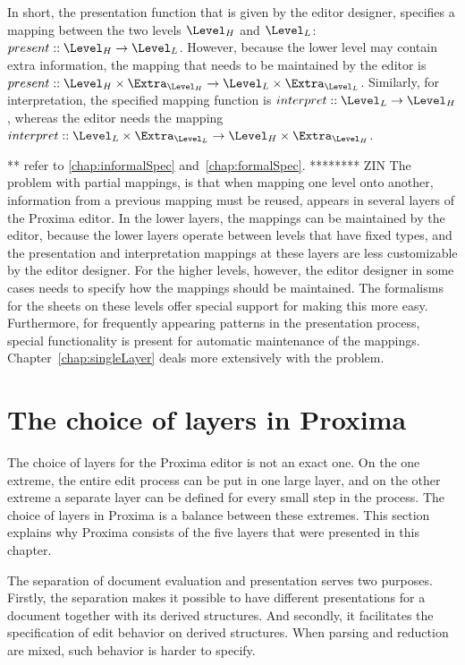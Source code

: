 In short, the presentation function that is given by the editor designer, specifies a mapping between the two levels $\Level_{H}$ and $\Level_{L}$:  $present :: \Level_{H} \rightarrow \Level_{L}$. However, because the lower level may contain extra information, the mapping that needs to be maintained by the editor is 
$present :: \Level_{H}\times \Extra_{\Level_{H}} \rightarrow \Level_{L}\times \Extra_{\Level_{L}}$. Similarly, for interpretation, the specified mapping function is 
$interpret :: \Level_{L} \rightarrow \Level_{H}$, whereas the editor needs the mapping 
$interpret :: \Level_{L} \times \Extra_{\Level_{L}} \rightarrow \Level_{H}\times \Extra_{\Level_{H}}$. 

** refer to \ref{chap:informalSpec} and~\ref{chap:formalSpec}.
******** ZIN
The problem with partial mappings, is that when mapping one level onto another, information from a previous mapping must be reused, appears in several layers of the Proxima editor. In the lower layers, the mappings can be maintained by the editor, because the lower layers operate between levels that have fixed types, and the presentation and interpretation mappings at these layers are less customizable by the editor designer. For the higher levels, however, the editor designer in some cases needs to specify how the mappings should be maintained. The formalisms for the sheets on these levels offer special support for making this more easy. Furthermore, for frequently appearing patterns in the presentation process, special functionality is present for automatic maintenance of the mappings. Chapter~\ref{chap:singleLayer} deals more extensively with the problem.
\ec

%																
%																
%																
\section{The choice of layers in Proxima}

The choice of layers for the Proxima editor is not an exact one. On the one extreme, the entire edit process can be put in one large layer, and on the other extreme a separate layer can be defined for every small step in the process. The choice of layers in Proxima is a balance between these extremes. This section explains why Proxima consists of the five layers that were presented in this chapter.

The separation of document evaluation and presentation serves two purposes. Firstly, the separation makes it possible to have different presentations for a document together with its derived structures. And secondly, it facilitates the specification of edit behavior on derived structures. When parsing and reduction are mixed, such behavior is harder to specify.

